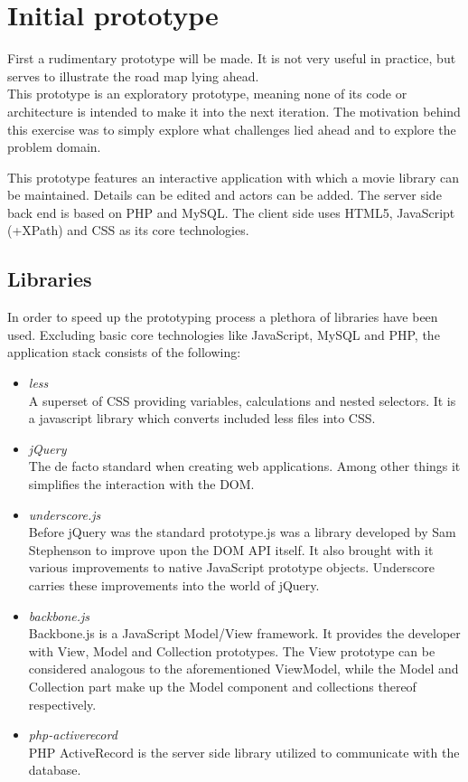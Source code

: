 \documentclass[twoside,11pt,openright]{report}
\begin{document}
\section{Initial prototype}
First a rudimentary prototype will be made. It is not very
useful in practice, but serves to illustrate the road map lying ahead.\\
This prototype is an exploratory prototype, meaning none of its code or
architecture is intended to make it into the next iteration. The motivation
behind this exercise was to simply explore what challenges lied ahead and to
explore the problem domain.

This prototype features an interactive application with which a movie
library can be maintained. Details can be edited and actors can be
added.
The server side back end is based on PHP and MySQL. The client side uses
HTML5, JavaScript (+XPath) and CSS as its core technologies.

\subsection{Libraries}
In order to speed up the prototyping process a plethora of libraries have been
used. Excluding basic core technologies like JavaScript, MySQL and PHP, the
application stack consists of the following:
\begin{itemize}
	\item \emph{less}\\
	A superset of CSS providing variables, calculations and nested selectors. It
	is a javascript library which converts included less files into CSS.
	\item \emph{jQuery}\\
	The de facto standard when creating web applications. Among other things it
	simplifies the interaction with the DOM.
	\item \emph{underscore.js}\\
	Before jQuery was the standard prototype.js was a library developed by
	Sam Stephenson to improve upon the DOM API itself. It also brought with it
	various improvements to native JavaScript prototype objects. Underscore
	carries these improvements into the world of jQuery.
	\item \emph{backbone.js}\\
	Backbone.js is a JavaScript Model/View framework. It provides the developer
	with View, Model and Collection prototypes. The View prototype can be
	considered analogous to the aforementioned ViewModel, while the Model and
	Collection part make up the Model component and collections thereof
	respectively.
	\item \emph{php-activerecord}\\
	PHP ActiveRecord is the server side library utilized to communicate with the
	database.
	
\end{itemize}
\end{document}
